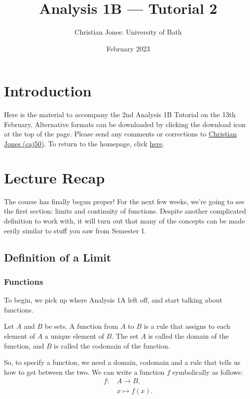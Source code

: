 \documentclass[
  17pt,
  a4paper]{extarticle}
\title{Analysis 1B --- Tutorial 2}
\author{Christian Jones: University of Bath}
\date{February 2023}
\theoremstyle{plain}
\theoremstyle{definition}
\theoremstyle{plain}
\theoremstyle{plain}
\theoremstyle{plain}
\theoremstyle{plain}
\theoremstyle{definition}
\theoremstyle{definition}
\theoremstyle{remark}
\theoremstyle{remark}
\let\BeginKnitrBlock\begin \let\EndKnitrBlock\end
\renewcommand{\;}{\,}
\begin{document}
\maketitle

{
\setcounter{tocdepth}{2}
\tableofcontents
}
\newpage
{}

\hypertarget{introduction}{%
\section*{Introduction}\label{introduction}}

Here is the material to accompany the 2nd Analysis 1B Tutorial on the 13th February. Alternative formats can be downloaded by clicking the download icon at the top of the page. Please send any comments or corrections to \href{mailto:caj50@bath.ac.uk}{Christian Jones (caj50)}. To return to the homepage, click \href{http://caj50.github.io/tutoring.html}{here}.

\hypertarget{lecture-recap}{%
\section{Lecture Recap}\label{lecture-recap}}

The course has finally begun proper! For the next few weeks, we're going to see the first section: limits and continuity of functions. Despite another complicated definition to work with, it will turn out that many of the concepts can be made eerily similar to stuff you saw from Semester 1.

\hypertarget{definition-of-a-limit}{%
\subsection{Definition of a Limit}\label{definition-of-a-limit}}

\hypertarget{functions}{%
\subsubsection{Functions}\label{functions}}

To begin, we pick up where Analysis 1A left off, and start talking about functions.
\BeginKnitrBlock{definition}[Function]
{\label{def:def1} }Let \(A\) and \(B\) be sets. A function from \(A\) to \(B\) is a rule that assigns to each element of \(A\) a unique element of \(B\). The set \(A\) is called the domain of the function, and \(B\) is called the codomain of the function.
\EndKnitrBlock{definition}
So, to specify a function, we need a domain, codomain and a rule that tells us how to get between the two. We can write a function \(f\) symbolically as follows:
\begin{align*}
f:\; &A \longrightarrow B,\\
&x \longmapsto f(x).
\end{align*}
\end{document}

